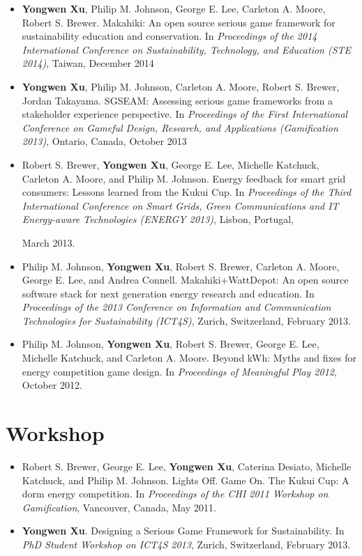 \begin{itemize}

\item \textbf{Yongwen Xu}, Philip M. Johnson, George E. Lee, Carleton A. Moore, Robert S. Brewer. Makahiki: An open source serious game framework for sustainability education and conservation.   
In \emph{Proceedings of the 2014 International Conference on Sustainability, Technology, and Education (STE 2014)}, Taiwan, December 2014
 	
\item \textbf{Yongwen Xu}, Philip M. Johnson, Carleton A. Moore, Robert S. Brewer, Jordan Takayama. SGSEAM: Assessing serious game frameworks from a stakeholder experience perspective.   
In \emph{Proceedings of the First International Conference on Gameful Design, Research, and Applications (Gamification 2013)}, Ontario, Canada, October 2013

\item Robert S. Brewer, \textbf{Yongwen Xu}, George E. Lee, Michelle Katchuck, Carleton A. Moore, and Philip M. Johnson. Energy feedback for smart grid consumers: Lessons learned from the Kukui Cup. In \emph{Proceedings of the Third International Conference on Smart Grids, Green Communications and IT Energy-aware Technologies (ENERGY 2013)}, Lisbon, Portugal, 

March 2013.

\item Philip M. Johnson, \textbf{Yongwen Xu}, Robert S. Brewer, Carleton A. Moore, George E. Lee, and Andrea Connell. Makahiki+WattDepot: An open source software stack for next generation energy research and education. In \emph{Proceedings of the 2013 Conference on Information and Communication Technologies for Sustainability (ICT4S)}, Zurich, Switzerland, February 2013.

\item Philip M. Johnson, \textbf{Yongwen Xu}, Robert S. Brewer, George E. Lee, Michelle Katchuck, and Carleton A. Moore. Beyond kWh: Myths and fixes for energy competition game design. In \emph{Proceedings of Meaningful Play 2012}, October 2012.

\end{itemize}


\section{Workshop}

\begin{itemize}

\item Robert S. Brewer, George E. Lee, \textbf{Yongwen Xu}, Caterina Desiato, Michelle Katchuck, and Philip M. Johnson. Lights Off. Game On. The Kukui Cup: A dorm energy competition. In \emph{Proceedings of the CHI 2011 Workshop on Gamification}, Vancouver, Canada, May 2011.

\item \textbf{Yongwen Xu}. Designing a Serious Game Framework for Sustainability. In \emph{PhD Student  Workshop on ICT4S 2013}, Zurich, Switzerland, February 2013.

\end{itemize}

